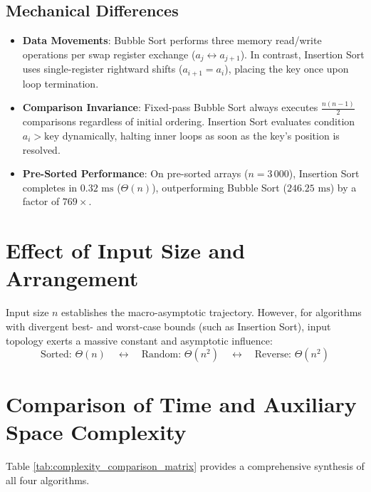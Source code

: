\subsection{Mechanical Differences}
\begin{itemize}
    \item \textbf{Data Movements}: Bubble Sort performs three memory read/write operations per swap register exchange ($a_j \leftrightarrow a_{j+1}$). In contrast, Insertion Sort uses single-register rightward shifts ($a_{i+1} = a_i$), placing the key once upon loop termination.
    \item \textbf{Comparison Invariance}: Fixed-pass Bubble Sort always executes $\frac{n(n-1)}{2}$ comparisons regardless of initial ordering. Insertion Sort evaluates condition $a_i > \text{key}$ dynamically, halting inner loops as soon as the key's position is resolved.
    \item \textbf{Pre-Sorted Performance}: On pre-sorted arrays ($n = 3\,000$), Insertion Sort completes in $0.32\text{ ms}$ ($\Theta(n)$), outperforming Bubble Sort ($246.25\text{ ms}$) by a factor of \textbf{$769\times$}.
\end{itemize}

\section{Effect of Input Size and Arrangement}
Input size $n$ establishes the macro-asymptotic trajectory. However, for algorithms with divergent best- and worst-case bounds (such as Insertion Sort), input topology exerts a massive constant and asymptotic influence:
$$\text{Sorted: } \Theta(n) \quad \longleftrightarrow \quad \text{Random: } \Theta(n^2) \quad \longleftrightarrow \quad \text{Reverse: } \Theta(n^2)$$

\section{Comparison of Time and Auxiliary Space Complexity}
Table \ref{tab:complexity_comparison_matrix} provides a comprehensive synthesis of all four algorithms.

